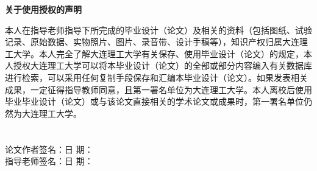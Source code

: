 
\centerline{\erhao{}\textbf {关于使用授权的声明}}
\label{grant}
\thispagestyle{headFancy}
\vspace*{18pt}
\linespread{1.25}
\song\xiaosan

本人在指导老师指导下所完成的毕业设计（论文）及相关的资料（包括图纸、试验记录、原始数据、实物照片、图片、录音带、设计手稿等），知识产权归属大连理工大学。本人完全了解大连理工大学有关保存、使用毕业设计（论文）的规定，本人授权大连理工大学可以将本毕业设计（论文）的全部或部分内容编入有关数据库进行检索，可以采用任何复制手段保存和汇编本毕业设计（论文）。如果发表相关成果，一定征得指导教师同意，且第一署名单位为大连理工大学。本人离校后使用毕业毕业设计（论文）或与该论文直接相关的学术论文或成果时，第一署名单位仍然为大连理工大学。\\
~\\
~\\
论文作者签名：\hspace{5cm}日  期：\\
指导老师签名：\hspace{5cm}日  期：
